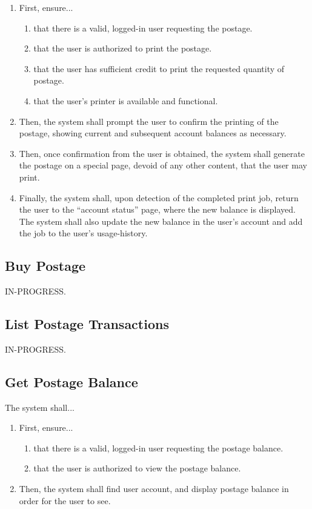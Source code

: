 \documentclass{scrreprt}
\begin{document}
\begin{enumerate}
\item First, ensure...
\begin{enumerate}
\item that there is a valid, logged-in user requesting the postage.
\item that the user is authorized to print the postage.
\item that the user has sufficient credit to print the requested quantity of 
postage.
\item that the user's printer is available and functional.
\end{enumerate}
\item Then, the system shall prompt the user to confirm the printing of the 
postage, showing current and subsequent account balances as necessary.
\item Then, once confirmation from the user is obtained, the system shall 
generate the postage on a special page, devoid of any other content, that the 
user may print.
\item Finally, the system shall, upon detection of the completed print job, 
return the user to the ``account status'' page, where the new balance is 
displayed. The system shall also update the new balance in the user's account 
and add the job to the user's usage-history.
\end{enumerate}

\subsection{Buy Postage}

IN-PROGRESS.

\subsection{List Postage Transactions}

IN-PROGRESS.

\subsection{Get Postage Balance}

The system shall...

\begin{enumerate}
\item First, ensure...
\begin{enumerate}
\item that there is a valid, logged-in user requesting the postage balance.
\item that the user is authorized to view the postage balance.
\end{enumerate}
\item Then, the system shall find user account, and display postage balance 
in order for the user to see.
\end{enumerate}
\end{document}

